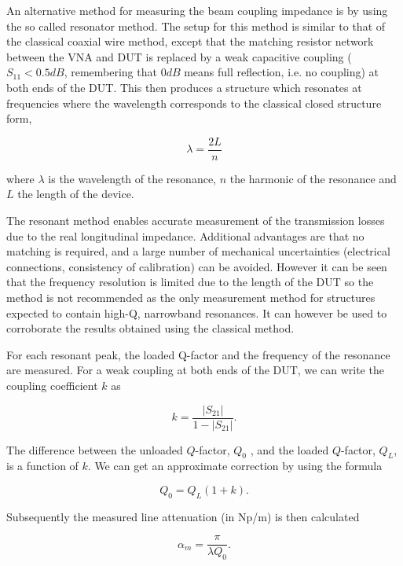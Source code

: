\documentclass[12pt,a4paper,twopage,openright]{article}
\begin{document}
An alternative method for measuring the beam coupling impedance is by using the so called resonator method. The setup for this method is similar to that of the classical coaxial wire method, except that the matching resistor network between the VNA and DUT is replaced by a weak capacitive coupling ($S_{11} < 0.5dB$, remembering that $0dB$ means full reflection, i.e. no coupling) at both ends of the DUT. This then produces a structure which resonates at frequencies where the wavelength corresponds to the classical closed structure form,

\begin{equation}
\lambda = \frac{2L}{n}
\end{equation}

where $\lambda$ is the wavelength of the resonance, $n$ the harmonic of the resonance and $L$ the length of the device. 

The resonant method enables accurate measurement of the transmission losses due to the real longitudinal impedance. Additional advantages are that no matching is required, and a large number of mechanical uncertainties (electrical connections, consistency of calibration) can be avoided. However it can be seen that the frequency resolution is limited due to the length of the DUT so the method is not recommended as the only measurement method for structures expected to contain high-Q, narrowband resonances. It can however be used to corroborate the results obtained using the classical method.

For each resonant peak, the loaded Q-factor and the frequency of the resonance are measured. For a weak coupling at both ends of the DUT, we can write the coupling coefficient $k$ as

\begin{equation}
k = \frac{\left| S_{21} \right|}{1 - \left| S_{21} \right| }.
\label{eqn:coupling_coeff}
\end{equation}

The difference between the unloaded $Q$-factor, $Q_{0}$ , and the loaded $Q$-factor, $Q_{L}$, is a function of $k$. We can get an approximate correction by using the formula

\begin{equation}
Q_{0} = Q_{L} \left( 1 + k  \right).
\label{eqn:Q_correc}
\end{equation}

Subsequently the measured line attenuation (in Np/m) is then calculated

\begin{equation}
\alpha_{m} = \frac{\pi}{\lambda Q_{0}}.
\label{eqn:atten}
\end{equation}
\end{document}
